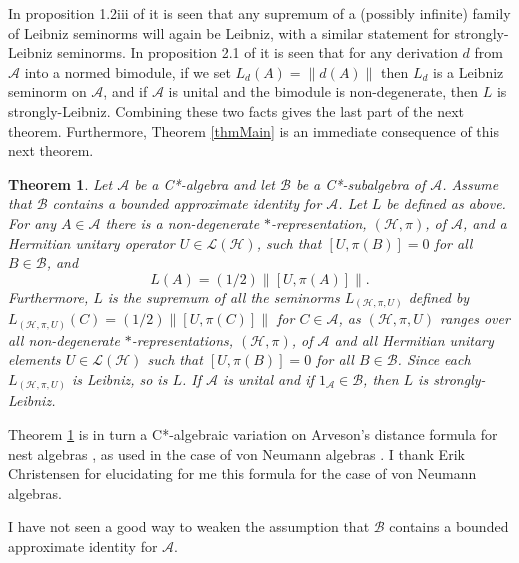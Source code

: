 \documentclass[12pt]{amsart}
\newcommand{\<}{\langle}
\renewcommand{\>}{\rangle}
\newcommand{\cA}{{\mathcal A}}
\newcommand{\cB}{{\mathcal B}}
\newcommand{\cH}{{\mathcal H}}
\newcommand{\cL}{{\mathcal L}}
\newtheorem{theorem}{Theorem}[section]
\theoremstyle{definition}   %
\begin{document}
In proposition 1.2iii of \cite{R21} it is seen that any supremum of
a (possibly infinite) family of Leibniz seminorms will again be
Leibniz, with a similar statement for strongly-Leibniz seminorms. 
In proposition 2.1 of \cite{R21} it is seen
that for any derivation $d$ from $\cA$ into a normed bimodule, if
we set $L_d(A) = \|d(A)\|$ then $L_d$ is a Leibniz seminorm
on $\cA$, and if $\cA$ is unital and the bimodule is non-degenerate,
then $L$ is strongly-Leibniz. Combining these two facts gives the last part of
the next theorem. Furthermore, Theorem \ref{thmMain} is 
an immediate consequence
of this next theorem.

\begin{theorem}
\label{thmArv}
Let $\cA$ be a C*-algebra and let $\cB$ be a C*-subalgebra of $\cA$.
Assume that $\cB$ contains a bounded approximate identity for $\cA$.
Let $L$ be defined as above.
For any $A \in \cA$ there is a non-degenerate $*$-representation,
$(\cH, \pi)$, of $\cA$, and a Hermitian unitary operator $U \in \cL(\cH)$,
such that $[U, \pi(B)] = 0$ for all $B \in \cB$, and
\[
L(A) = (1/2)\|[U, \pi(A)]\|   .
\]
Furthermore, $L$ is the supremum of all the seminorms $L_{(\cH, \pi, U)}$
defined by $L_{(\cH, \pi, U)}(C) = (1/2)\|[U, \pi(C)]\|$ for $C \in \cA$,
as $(\cH, \pi, U)$ ranges over all 
non-degenerate $*$-representations, $(\cH, \pi)$,
of $\cA$ and all Hermitian unitary elements $U \in \cL(\cH)$ such that
$[U, \pi(B)] = 0$ for all $B \in \cB$. Since each $L_{(\cH, \pi, U)}$
is Leibniz, so is $L$.  If $\cA$ is unital and if $1_\cA \in \cB$, then $L$ is
strongly-Leibniz.
\end{theorem}

Theorem \ref{thmArv} is in turn a C*-algebraic 
variation on Arveson's distance
formula for nest algebras \cite{Arv}, 
as used in the case of von Neumann algebras
\cite{Chr}. I thank Erik Christensen for elucidating for me this 
formula for the case of 
von Neumann algebras.

I have not seen a good way to weaken the assumption
that $\cB$ contains a bounded approximate identity for $\cA$.
\end{document}
